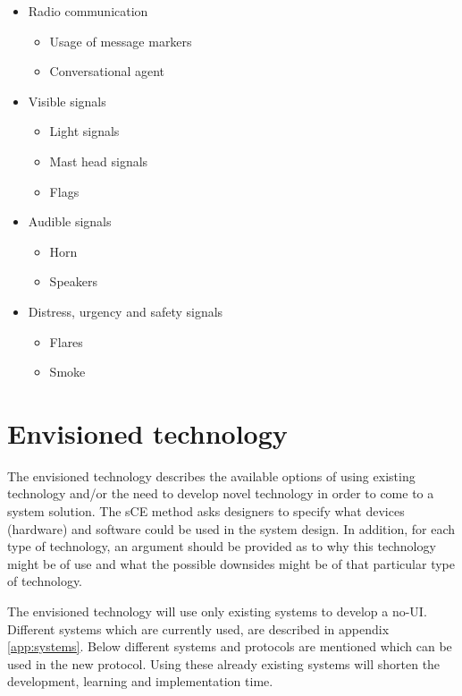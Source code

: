 \begin{itemize}
	\item Radio communication
	\begin{itemize}
		\item Usage of message markers
		\item Conversational agent
	\end{itemize}
	\item Visible signals
	\begin{itemize}
		\item Light signals
		\item Mast head signals
		\item Flags
	\end{itemize}
	\item Audible signals
	\begin{itemize}
		\item Horn
		\item Speakers
	\end{itemize}
	\item Distress, urgency and safety signals
	\begin{itemize}
		\item Flares
		\item Smoke
	\end{itemize}
\end{itemize}

\section{Envisioned technology}
The envisioned technology describes the available options of using existing technology and/or the need to develop novel technology in order to come to a system solution. The sCE method asks designers to specify what devices (hardware) and software could be used in the system design. In addition, for each type of technology, an argument should be provided as to why this technology might be of use and what the possible downsides might be of that particular type of technology.

The envisioned technology will use only existing systems to develop a \acf{no-UI}. Different systems which are currently used, are described in appendix \ref{app:systems}. Below different systems and protocols are mentioned which can be used in the new protocol. Using these already existing systems will shorten the development, learning and implementation time.

